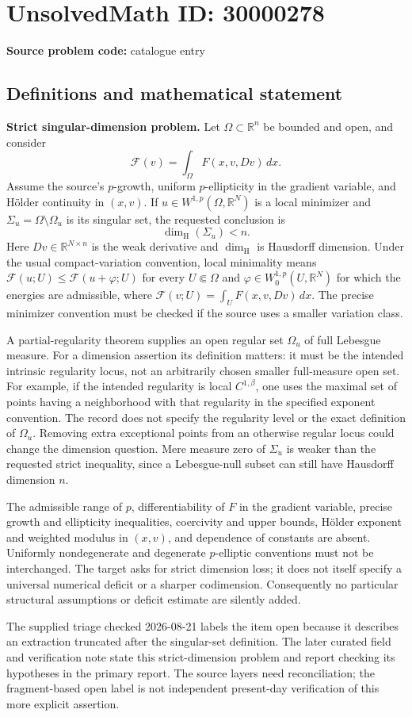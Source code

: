 \documentclass[11pt]{article}
\newcommand{\R}{\mathbb{R}}
\begin{document}
\section*{UnsolvedMath ID: 30000278}
\textbf{Source problem code:} catalogue entry
\subsection{Definitions and mathematical statement}
\textbf{Strict singular-dimension problem.} Let \(\Omega\subset\R^n\) be bounded and open, and consider\[\mathcal F(v)=\int_\Omega F(x,v,Dv)\,dx.\] Assume the source's \(p\)-growth, uniform \(p\)-ellipticity in the gradient variable, and H\"older continuity in \((x,v)\). If \(u\in W^{1,p}(\Omega,\R^N)\) is a local minimizer and \(\Sigma_u=\Omega\setminus\Omega_u\) is its singular set, the requested conclusion is\[\dim_{\mathrm H}(\Sigma_u)<n.\] Here \(Dv\in\R^{N\times n}\) is the weak derivative and \(\dim_{\mathrm H}\) is Hausdorff dimension. Under the usual compact-variation convention, local minimality means \(\mathcal F(u;U)\le\mathcal F(u+\varphi;U)\) for every \(U\Subset\Omega\) and \(\varphi\in W^{1,p}_0(U,\R^N)\) for which the energies are admissible, where \(\mathcal F(v;U)=\int_UF(x,v,Dv)\,dx\). The precise minimizer convention must be checked if the source uses a smaller variation class.\par A partial-regularity theorem supplies an open regular set \(\Omega_u\) of full Lebesgue measure. For a dimension assertion its definition matters: it must be the intended intrinsic regularity locus, not an arbitrarily chosen smaller full-measure open set. For example, if the intended regularity is local \(C^{1,\beta}\), one uses the maximal set of points having a neighborhood with that regularity in the specified exponent convention. The record does not specify the regularity level or the exact definition of \(\Omega_u\). Removing extra exceptional points from an otherwise regular locus could change the dimension question. Mere measure zero of \(\Sigma_u\) is weaker than the requested strict inequality, since a Lebesgue-null subset can still have Hausdorff dimension \(n\).\par The admissible range of \(p\), differentiability of \(F\) in the gradient variable, precise growth and ellipticity inequalities, coercivity and upper bounds, H\"older exponent and weighted modulus in \((x,v)\), and dependence of constants are absent. Uniformly nondegenerate and degenerate \(p\)-elliptic conventions must not be interchanged. The target asks for strict dimension loss; it does not itself specify a universal numerical deficit or a sharper codimension. Consequently no particular structural assumptions or deficit estimate are silently added.\par The supplied triage checked 2026-08-21 labels the item open because it describes an extraction truncated after the singular-set definition. The later curated field and verification note state this strict-dimension problem and report checking its hypotheses in the primary report. The source layers need reconciliation; the fragment-based open label is not independent present-day verification of this more explicit assertion.
\end{document}
